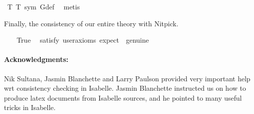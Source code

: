 \begin{isabellebody}
\isamarkupfalse%
\ T{}\ T{}\ sym\ G{\isacharunderscore}def\ \isamarkupfalse%
\ metis%
\endisatagproof
{\isafoldproof}%
%
\isadelimproof
%
\endisadelimproof
%
\begin{isamarkuptext}%
Finally, the consistency of our entire theory with Nitpick.%
\end{isamarkuptext}%
\isamarkuptrue%
\ \ \isamarkupfalse%
\ True\ \isamarkupfalse%
\ {\isacharbrackleft}satisfy{\isacharcomma}\ user{\isacharunderscore}axioms{\isacharcomma}\ expect\ {\isacharequal}\ genuine{\isacharbrackright}%
\isadelimproof
\ %
\endisadelimproof
%
\isatagproof
{}\isamarkupfalse%
%
\endisatagproof
{\isafoldproof}%
%
\isadelimproof
%
\endisadelimproof
%
\begin{isamarkuptext}%
\paragraph{Acknowledgments:} Nik Sultana, Jasmin Blanchette and Larry Paulson provided 
very important help wrt consistency checking in Isabelle. Jasmin Blanchette instructed us on how to 
produce latex documents from Isabelle sources, and he pointed to many useful tricks in Isabelle.%
\end{isamarkuptext}%
\isamarkuptrue%
%
\isadelimtheory
%
\endisadelimtheory
%
\isatagtheory
%
\endisatagtheory
{\isafoldtheory}%
%
\isadelimtheory
%
\endisadelimtheory
\ \end{isabellebody}%
